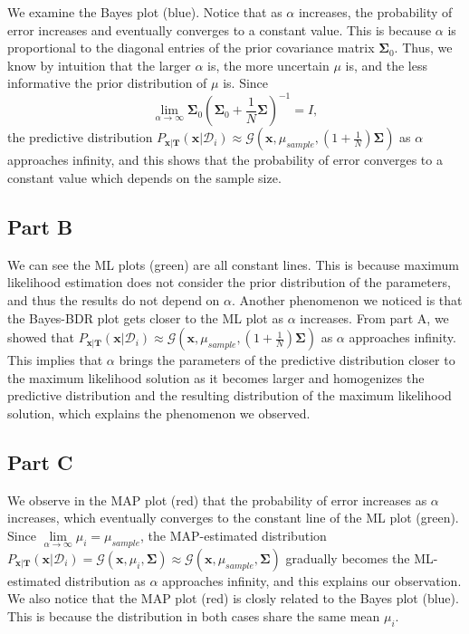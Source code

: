 \documentclass{article}
\newcommand*{\G}{\mathcal{G}}
\newcommand*{\D}{\mathcal{D}}
\begin{document}
We examine the Bayes plot (blue). Notice that as $\alpha$ increases, the probability of error increases and eventually converges to a constant value. This is because $\alpha$ is proportional to the diagonal entries of the prior covariance matrix $\mathbf{\Sigma}_0$. Thus, we know by intuition that the larger $\alpha$ is, the more uncertain $\mu$ is, and the less informative the prior distribution of $\mu$ is. Since 
\[
    \lim\limits_{\alpha \to \infty} \mathbf{\Sigma}_0\left(\mathbf{\Sigma}_0 + \frac{1}{N}\mathbf{\Sigma}\right)^{-1} = I,
\]
the predictive distribution $P_{\mathbf{x}|\mathbf{T}}(\mathbf{x}|\D_i) \approx \G\left(\mathbf{x}, \mu_{sample}, \left(1 + \frac{1}{N}\right)\mathbf{\Sigma}\right)$ as $\alpha$ approaches infinity, and this shows that the probability of error converges to a constant value which depends on the sample size.

\subsection*{Part B}

We can see the ML plots (green) are all constant lines. This is because maximum likelihood estimation does not consider the prior distribution of the parameters, and thus the results do not depend on $\alpha$. Another phenomenon we noticed is that the Bayes-BDR plot gets closer to the ML plot as $\alpha$ increases. From part A, we showed that $P_{\mathbf{x}|\mathbf{T}}(\mathbf{x}|\D_i) \approx \G\left(\mathbf{x}, \mu_{sample}, \left(1 + \frac{1}{N}\right)\mathbf{\Sigma}\right)$ as $\alpha$ approaches infinity. This implies that $\alpha$ brings the parameters of the predictive distribution closer to the maximum likelihood solution as it becomes larger and homogenizes the predictive distribution and the resulting distribution of the maximum likelihood solution, which explains the phenomenon we observed.

\subsection*{Part C}

We observe in the MAP plot (red) that the probability of error increases as $\alpha$ increases, which eventually converges to the constant line of the ML plot (green). Since $\lim\limits_{\alpha \to \infty} \mu_i = \mu_{sample}$, the MAP-estimated distribution $P_{\mathbf{x}|\mathbf{T}}(\mathbf{x}|\D_i) = \G(\mathbf{x}, \mu_{i}, \mathbf{\Sigma}) \approx \G(\mathbf{x}, \mu_{sample}, \mathbf{\Sigma})$ gradually becomes the ML-estimated distribution as $\alpha$ approaches infinity, and this explains our observation. We also notice that the MAP plot (red) is closly related to the Bayes plot (blue). This is because the distribution in both cases share the same mean $\mu_i$.
\end{document}

